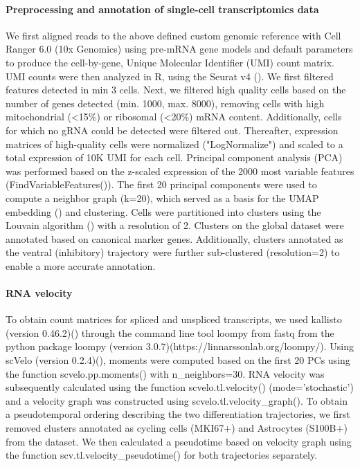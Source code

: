\paragraph{Preprocessing and annotation of single-cell transcriptomics data}
We first aligned reads to the above defined custom genomic reference with Cell Ranger 6.0 (10x Genomics) using pre-mRNA gene models and default parameters to produce the cell-by-gene, Unique Molecular Identifier (UMI) count matrix. UMI counts were then analyzed in R, using the Seurat v4 (\cite{stuart_comprehensive_2019}). We first filtered features detected in min 3 cells. Next, we filtered high quality cells based on the number of genes detected (min. 1000, max. 8000), removing cells with high mitochondrial (<15\%) or ribosomal (<20\%) mRNA content. Additionally, cells for which no gRNA could be detected were filtered out. Thereafter, expression matrices of high-quality cells were normalized ("LogNormalize") and scaled to a total expression of 10K UMI for each cell. Principal component analysis (PCA) was performed based on the z-scaled expression of the 2000 most variable features (FindVariableFeatures()). The first 20 principal components were used to compute a neighbor graph (k=20), which served as a basis for the UMAP embedding (\cite{mcinnes_umap_2018}) and clustering. Cells were partitioned into clusters using the Louvain algorithm (\cite{blondel_fast_2008}) with a resolution of 2. Clusters on the global dataset were annotated based on canonical marker genes. Additionally, clusters annotated as the ventral (inhibitory) trajectory were further sub-clustered (resolution=2) to enable a more accurate annotation. 

\paragraph{RNA velocity}
To obtain count matrices for spliced and unspliced transcripts, we used kallisto (version 0.46.2)(\cite{bray_near-optimal_2016}) through the command line tool loompy from fastq from the python package loompy (version 3.0.7)(https://linnarssonlab.org/loompy/). Using scVelo (version 0.2.4)(\cite{bergen_generalizing_2020}), moments were computed based on the first 20 PCs using the function scvelo.pp.moments() with n\_neighbors=30. RNA velocity was subsequently calculated using the function scvelo.tl.velocity() (mode='stochastic') and a velocity graph was constructed using scvelo.tl.velocity\_graph(). To obtain a pseudotemporal ordering describing the two differentiation trajectories, we first removed clusters annotated as cycling cells (MKI67+) and Astrocytes (S100B+) from the dataset. We then calculated a pseudotime based on velocity graph using the function scv.tl.velocity\_pseudotime() for both trajectories separately.

